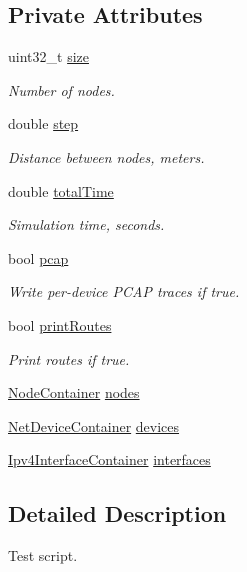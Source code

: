 \subsection*{Private Attributes}
\begin{DoxyCompactItemize}
\item 
uint32\+\_\+t \hyperlink{classAodvExample_a981713615ce1e6eaf66fe20c0fae3136}{size}
\begin{DoxyCompactList}\small\item\em Number of nodes. \end{DoxyCompactList}\item 
double \hyperlink{classAodvExample_af2cfac181b97285129c0d17a5edd66f0}{step}
\begin{DoxyCompactList}\small\item\em Distance between nodes, meters. \end{DoxyCompactList}\item 
double \hyperlink{classAodvExample_a842f2dbbf8a6e4e33c275cbfa2d20bf2}{total\+Time}
\begin{DoxyCompactList}\small\item\em Simulation time, seconds. \end{DoxyCompactList}\item 
bool \hyperlink{classAodvExample_a562ab7581322f11c301999cb365ba33e}{pcap}
\begin{DoxyCompactList}\small\item\em Write per-\/device P\+C\+AP traces if true. \end{DoxyCompactList}\item 
bool \hyperlink{classAodvExample_a51ce8d78ff5c5e9725038d3c6fd29a33}{print\+Routes}
\begin{DoxyCompactList}\small\item\em Print routes if true. \end{DoxyCompactList}\item 
\hyperlink{classns3_1_1NodeContainer}{Node\+Container} \hyperlink{classAodvExample_a6a0e7d16457d9460d27f8a9407e2bb7f}{nodes}
\item 
\hyperlink{classns3_1_1NetDeviceContainer}{Net\+Device\+Container} \hyperlink{classAodvExample_ac84e7dbc2ac26566258b3ec8ee0dd0b3}{devices}
\item 
\hyperlink{classns3_1_1Ipv4InterfaceContainer}{Ipv4\+Interface\+Container} \hyperlink{classAodvExample_a4208ce6498334663b627c2fa0d2f5ed5}{interfaces}
\end{DoxyCompactItemize}


\subsection{Detailed Description}
Test script. 

